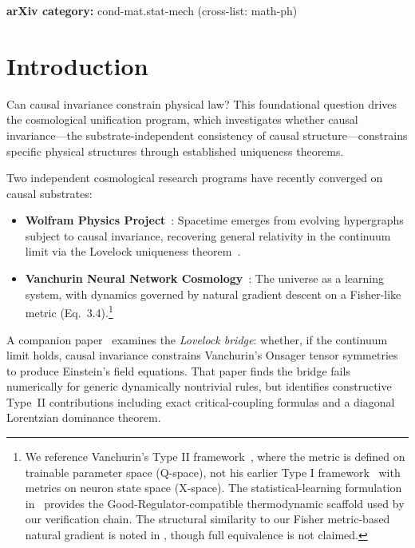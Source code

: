 \documentclass[11pt,a4paper]{article}
\theoremstyle{plain}
\theoremstyle{definition}
\theoremstyle{remark}
\begin{document}
\vspace{1em}
\noindent\textbf{arXiv category:} cond-mat.stat-mech (cross-list: math-ph)


\section{Introduction}
\label{sec:intro}

Can causal invariance constrain physical law? This foundational question drives the cosmological unification program, which investigates whether causal invariance---the substrate-independent consistency of causal structure---constrains specific physical structures through established uniqueness theorems.

Two independent cosmological research programs have recently converged on causal substrates:
\begin{itemize}[noitemsep]
\item \textbf{Wolfram Physics Project}~\cite{wolfram2020ruliad}: Spacetime emerges from evolving hypergraphs subject to causal invariance, recovering general relativity in the continuum limit via the Lovelock uniqueness theorem~\cite{lovelock1971}.

\item \textbf{Vanchurin Neural Network Cosmology}~\cite{vanchurin2020world,vanchurin2020ml,vanchurin2022qg,vanchurin2025covariant,vanchurin2025geometric}: The universe as a learning system, with dynamics governed by natural gradient descent on a Fisher-like metric (Eq.~3.4).\footnote{We reference Vanchurin's Type II framework~\cite{vanchurin2022qg,vanchurin2025covariant,vanchurin2025geometric}, where the metric is defined on trainable parameter space (Q-space), not his earlier Type I framework~\cite{vanchurin2020world} with metrics on neuron state space (X-space). The statistical-learning formulation in~\cite{vanchurin2020ml} provides the Good-Regulator-compatible thermodynamic scaffold used by our verification chain. The structural similarity to our Fisher metric-based natural gradient is noted in , though full equivalence is not claimed.}
\end{itemize}

A companion paper~\cite{companion_lovelock} examines the \emph{Lovelock bridge}: whether, if the continuum limit holds, causal invariance constrains Vanchurin's Onsager tensor symmetries to produce Einstein's field equations. That paper finds the bridge fails numerically for generic dynamically nontrivial rules, but identifies constructive Type~II contributions including exact critical-coupling formulas and a diagonal Lorentzian dominance theorem.
\end{document}
